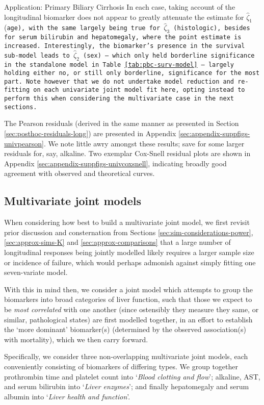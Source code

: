 \begin{chapter}{\label{cha:app-PBC}Application: Primary Biliary Cirrhosis}
  In each case, taking account of the longitudinal biomarker does not appear to greatly attenuate the estimate for $\hat{\zeta}_1$ (\tt{age}), with the same largely being true for $\hat{\zeta}_3$ (\tt{histologic}), besides for serum bilirubin and hepatomegaly, where the point estimate is increased. Interestingly, the biomarker's presence in the survival sub-model leads to $\hat{\zeta}_2$ (\tt{sex}) -- which only held borderline significance in the standalone model in Table \ref{tab:pbc-surv-model} -- largely holding either no, or still only borderline, significance for the most part. Note however that we do not undertake model reduction and re-fitting on each univariate joint model fit here, opting instead to perform this when considering the multivariate case in the next sections.
  
  The Pearson residuals (derived in the same manner as presented in Section \ref{sec:posthoc-residuals-long}) are presented in Appendix \ref{sec:appendix-suppfigs-univpearson}. We note little awry amongst these results; save for some larger residuals for, say, alkaline. Two exemplar Cox-Snell residual plots are shown in Appendix \ref{sec:appendix-suppfigs-univcoxsnell}, indicating broadly good agreement with observed and theoretical curves.
  
  \subsection{Multivariate joint models}\label{sec:pbc-jointmodelling-multivs}
  \rmtoc
  When considering how best to build a multivariate joint model, we first revisit prior discussion and consternation from Sections \ref{sec:sim-considerations-power}, \ref{sec:approx-sims-K} and \ref{sec:approx-comparisons} that a large number of longitudinal responses being jointly modelled likely requires a larger sample size or incidence of failure, which would perhaps admonish against simply fitting one seven-variate model.

  With this in mind then, we consider a joint model which attempts to group the biomarkers into broad categories of liver function, such that those we expect to be \textit{most correlated} with one another (since ostensibly they measure they same, or similar, pathological states) are first modelled together, in an effort to establish the `more dominant' biomarker(s) (determined by the observed association(s) with mortality), which we then carry forward.

  Specifically, we consider three non-overlapping multivariate joint models, each conveniently consisting of biomarkers of differing types. We group together prothrombin time and platelet count into `\textit{Blood clotting and flow}'; alkaline, AST, and serum bilirubin into `\textit{Liver enzymes}'; and finally hepatomegaly and serum albumin into `\textit{Liver health and function}'. 


\end{chapter}
